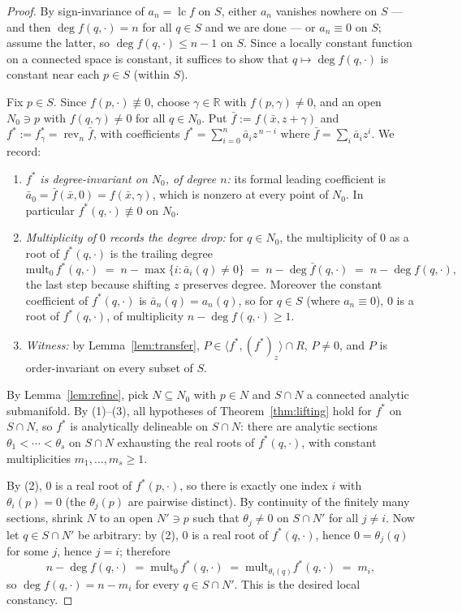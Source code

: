 \documentclass[11pt,a4paper]{article}
\theoremstyle{definition}
\newcommand{\R}{\mathbb{R}}
\newcommand{\xb}{\bar{x}}
\newcommand{\lc}{\operatorname{lc}}
\newcommand{\rev}{\operatorname{rev}}
\newcommand{\ideal}[1]{\langle #1\rangle}
\begin{document}
\begin{proof}
By sign-invariance of $a_n = \lc f$ on $S$, either $a_n$ vanishes nowhere on
$S$ --- and then $\deg f(q,\cdot) = n$ for all $q \in S$ and we are done --- or
$a_n \equiv 0$ on $S$; assume the latter, so $\deg f(q,\cdot) \le n-1$ on $S$.
Since a locally constant function on a connected space is constant, it
suffices to show that $q \mapsto \deg f(q,\cdot)$ is constant near each
$p \in S$ (within $S$).

Fix $p \in S$. Since $f(p,\cdot) \not\equiv 0$, choose $\gamma \in \R$ with
$f(p,\gamma) \neq 0$, and an open $N_0 \ni p$ with $f(q,\gamma) \neq 0$ for
all $q \in N_0$. Put $\bar f := f(\xb, z+\gamma)$ and
$f^* := f^*_\gamma = \rev_n \bar f$, with coefficients
$f^* = \sum_{i=0}^n \bar a_i z^{\,n-i}$ where
$\bar f = \sum_i \bar a_i z^i$. We record:
\begin{enumerate}[label=(\arabic*)]
\item \emph{$f^*$ is degree-invariant on $N_0$, of degree $n$:} its formal
  leading coefficient is $\bar a_0 = \bar f(\xb,0) = f(\xb,\gamma)$, which is
  nonzero at every point of $N_0$. In particular $f^*(q,\cdot)\not\equiv 0$
  on $N_0$.
\item \emph{Multiplicity of $0$ records the degree drop:} for $q \in N_0$,
  the multiplicity of $0$ as a root of $f^*(q,\cdot)$ is the trailing degree
  \[
    \mathrm{mult}_0\, f^*(q,\cdot)
      \;=\; n - \max\{ i : \bar a_i(q) \neq 0\}
      \;=\; n - \deg \bar f(q,\cdot)
      \;=\; n - \deg f(q,\cdot),
  \]
  the last step because shifting $z$ preserves degree. Moreover the constant
  coefficient of $f^*(q,\cdot)$ is $\bar a_n(q) = a_n(q)$, so for
  $q \in S$ (where $a_n \equiv 0$), $0$ is a root of $f^*(q,\cdot)$, of
  multiplicity $n - \deg f(q,\cdot) \ge 1$.
\item \emph{Witness:} by Lemma~\ref{lem:transfer},
  $P \in \ideal{f^*, (f^*)_z} \cap R$, $P \neq 0$, and $P$ is order-invariant
  on every subset of $S$.
\end{enumerate}
By Lemma~\ref{lem:refine}, pick $N \subseteq N_0$ with $p \in N$ and
$S \cap N$ a connected analytic submanifold. By (1)--(3), all hypotheses of
Theorem~\ref{thm:lifting} hold for $f^*$ on $S \cap N$, so $f^*$ is
analytically delineable on $S\cap N$: there are analytic sections
$\theta_1 < \cdots < \theta_s$ on $S \cap N$ exhausting the real roots of
$f^*(q,\cdot)$, with constant multiplicities $m_1,\dots,m_s \geq 1$.

By (2), $0$ is a real root of $f^*(p,\cdot)$, so there is exactly one index
$i$ with $\theta_i(p) = 0$ (the $\theta_j(p)$ are pairwise distinct). By
continuity of the finitely many sections, shrink $N$ to an open
$N' \ni p$ such that $\theta_j \neq 0$ on $S \cap N'$ for all $j \neq i$. Now
let $q \in S \cap N'$ be arbitrary: by (2), $0$ is a real root of
$f^*(q,\cdot)$, hence $0 = \theta_j(q)$ for some $j$, hence $j = i$; therefore
\[
  n - \deg f(q,\cdot) \;=\; \mathrm{mult}_0\, f^*(q,\cdot)
    \;=\; \mathrm{mult}_{\theta_i(q)} f^*(q,\cdot) \;=\; m_i ,
\]
so $\deg f(q,\cdot) = n - m_i$ for every $q \in S\cap N'$. This is the desired
local constancy.
\end{proof}
\end{document}
